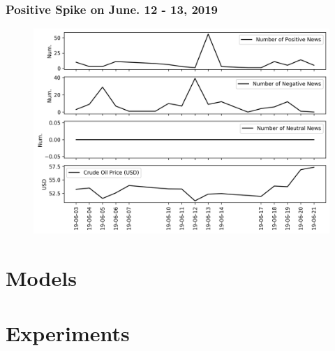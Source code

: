 \documentclass[12pt]{article}
\begin{document}
	\subsubsection{Positive Spike on June. 12 - 13, 2019}
	\begin{figure}[H]
		\centering
		\small
		\includegraphics[width=\linewidth]{figures/case_studies/20190612_10d.png}
		\caption{}
	\end{figure}
	\section{Models}
	
	\section{Experiments}

	
	
	

%	
\end{document}
